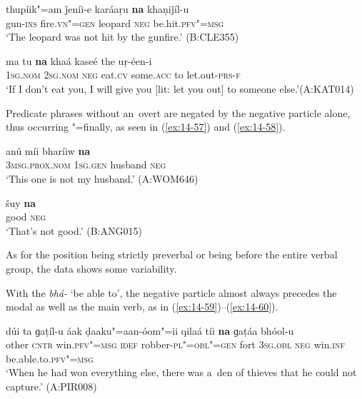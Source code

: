 \begin{exe}
\ex
\label{ex:14-55}
\gll thupíik"=am ǰeníi-e karáaṛu \textbf{na} khaṇiǰíl-u \\
gun-\textsc{ins} fire.\textsc{vn"=gen} leopard \textsc{neg} be.hit.\textsc{pfv"=msg}  \\
\glt `The leopard was not hit by the gunfire.' (B:CLE355)

\ex
\label{ex:14-56}
\gll ma tu \textbf{na} khaá kaseé the uṛ-éen-i \\
\textsc{1sg.nom} \textsc{2sg.nom} \textsc{neg} eat.\textsc{cv} some.\textsc{acc} to let.out-\textsc{prs-f} \\
\glt `If I don't eat you, I will give you [lit: let you out] to someone else.'\newline (A:KAT014)
\end{exe}

Predicate  phrases without an~overt  are negated by the negative particle alone, thus occurring "=finally, as seen in (\ref{ex:14-57}) and (\ref{ex:14-58}).

\begin{exe}
\ex
\label{ex:14-57}
\gll anú míi bharíiw \textbf{na} \\
\textsc{3msg.prox.nom} \textsc{1sg.gen} husband \textsc{neg} \\
\glt `This one is not my husband.' (A:WOM646)

\ex
\label{ex:14-58}
\gll šuy \textbf{na} \\
good \textsc{neg} \\
\glt `That's not good.' (B:ANG015)
\end{exe}

As for the position being strictly preverbal or being before the entire verbal group, the data shows some variability. 


With the  \textit{bhá-} `be able to', the negative particle almost always precedes the modal as well as the main verb, as in (\ref{ex:14-59})--(\ref{ex:14-60}).

\ea
\label{ex:14-59}
\gll dúi ta ɡaṭíl-u áak ḍaaku"=aan-óom"=ii qilaá tíi \textbf{na} ɡaṭáa bhóol-u \\
other \textsc{cntr} win.\textsc{pfv"=msg} \textsc{idef} robber-\textsc{pl"=obl"=gen} fort  \textsc{3sg.obl} \textsc{neg} win.\textsc{inf} be.able.to.\textsc{pfv"=msg}  \\
\glt `When he had won everything else, there was a~den of thieves that he could not capture.' (A:PIR008)

